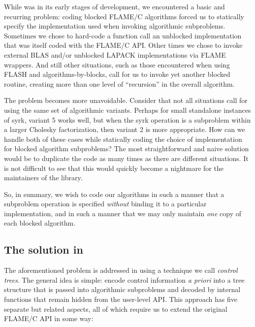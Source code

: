 
While \libflame was in its early stages of development, we encountered a basic
and recurring problem:
coding blocked FLAME/C algorithms forced us to statically specify the
implementation used when invoking algorithmic subproblems.
Sometimes we chose to hard-code a function call an unblocked implementation
that was itself coded with the FLAME/C API.
Other times we chose to invoke external BLAS and/or unblocked LAPACK
implementations via FLAME wrappers.
And still other situations, such as those encountered when using FLASH and
algorithms-by-blocks, call for us to invoke yet another blocked
routine, creating more than one level of ``recursion'' in the overall
algorithm.

The problem becomes more unavoidable.
Consider that not all situations call for using the same set of algorithmic
variants.
Perhaps for small standalone instances of {\sc syrk}, variant 5 works
well, but when the {\sc syrk} operation is a subproblem within a larger
Cholesky factorization, then variant 2 is more appropriate.
How can we handle both of these cases while statically coding the
choice of implementation for blocked algorithm subproblems?
The most straightforward and naive solution would be to duplicate the
code as many times as there are different situations.
It is not difficult to see that this would quickly become a nightmare for
the maintainers of the library.

So, in summary, we wish to code our algorithms in such a manner that a
subproblem operation is specified {\em without} binding it to a
particular implementation, and in such a manner that we may only
maintain {\em one} copy of each blocked algorithm.



\subsection{The solution in \libflame}


The aforementioned problem is addressed in \libflame using a technique we
call {\em control trees}.
The general idea is simple: encode control information {\em a priori}
into a tree structure that is passed into algorithmic subproblems and
decoded by internal functions that remain hidden from the user-level API.
This approach has five separate but related aspects, all of which require
us to extend the original FLAME/C API in some way:

